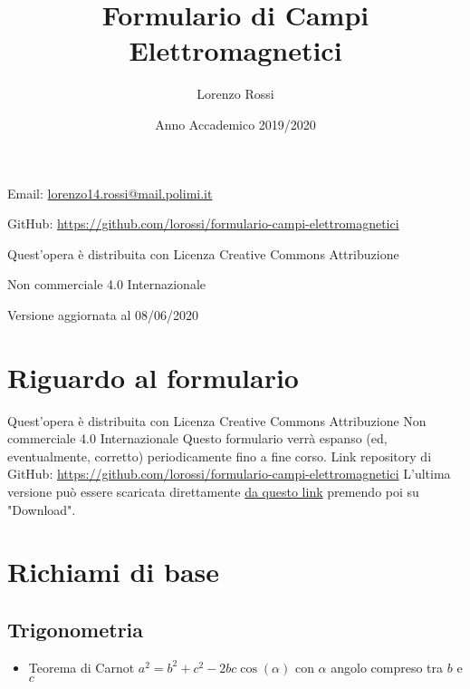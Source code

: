 \documentclass{article}
\title{\Huge Formulario di Campi Elettromagnetici}
\author{\LARGE Lorenzo Rossi}
\date{\LARGE Anno Accademico 2019/2020}
\begin{document}
\maketitle

\vspace{18em}

\large
\begin{doublespacing}
\centerline{Email: \href{mailto://lorenzo14.rossi@mail.polimi.it}{lorenzo14.rossi@mail.polimi.it}}
\centerline{GitHub: \url{https://github.com/lorossi/formulario-campi-elettromagnetici}}

\vspace{18em}
\centerline{Quest'opera è distribuita con Licenza Creative Commons Attribuzione}
\centerline{Non commerciale 4.0 Internazionale \ccbynceu}
\centerline{Versione aggiornata al 08/06/2020}
\end{doublespacing}
\newpage


\tableofcontents
\clearpage
{}
\newpage

\section{Riguardo al formulario}
Quest'opera è distribuita con Licenza Creative Commons \newline Attribuzione Non commerciale 4.0 Internazionale \ccbynceu \newline
Questo formulario verrà espanso (ed, eventualmente, corretto) periodicamente fino a fine corso. \newline
Link repository di GitHub: \url{https://github.com/lorossi/formulario-campi-elettromagnetici} \newline
L'ultima versione può essere scaricata direttamente \href{https://github.com/lorossi/formulario-campi-elettromagnetici/blob/master/formulario_campi.pdf}{da questo link} premendo poi su "Download".

\section{Richiami di base}
\subsection{Trigonometria}
\begin{itemize}
	\item Teorema di Carnot \( a^2 = b^2 + c^2 - 2bc\cos(\alpha)\) con \(\alpha\) angolo compreso tra \(b\) e \(c\) 
\end{itemize}
\end{document}
